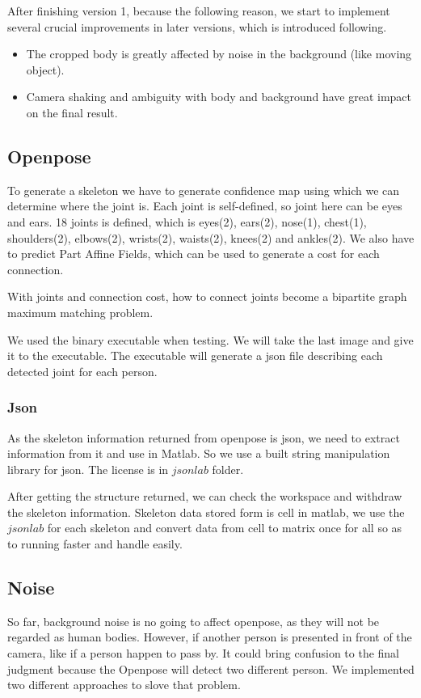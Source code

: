 \documentclass[11pt,twocolumn,letterpaper]{article}
\begin{document}
		\par
		After finishing version 1, because the following reason, we start to implement several crucial improvements in later versions, which is introduced following.
		\begin{itemize}
		\item The cropped body is greatly affected by noise in the background (like moving object).
		\item Camera shaking and ambiguity with body and background have great impact on the final result.
		\end{itemize}
	\subsection{Openpose\cite{cao2017realtime}}
	    \par To generate a skeleton we have to generate confidence map using which we can determine where the joint is.
		Each joint is self-defined, so joint here can be eyes and ears.
		18 joints is defined, which is eyes(2), ears(2), nose(1), chest(1), shoulders(2), elbows(2), wrists(2), waists(2), knees(2) and ankles(2).
		We also have to predict Part Affine Fields, which can be used to generate a cost for each connection.
		\par With joints and connection cost, how to connect joints become a bipartite graph maximum matching problem.
		\par We used the binary executable\cite{cao2017realtime} when testing. We will take the last image and give it to the executable. The executable will generate a json file describing each detected joint for each person.
	    \subsubsection{Json}
        \par As the skeleton information returned from openpose is json, we need to extract information from it and use in Matlab. So we use a built string manipulation library for json. The license is in $jsonlab$ folder.
        \par After getting the structure returned, we can check the workspace and withdraw the skeleton information. Skeleton data stored form is cell in matlab, we use the $jsonlab$ for each skeleton and convert data from cell to matrix once for all so as to running faster and handle easily.

	\subsection{Noise}
\par
So far, background noise is no going to affect openpose, as they will not be regarded as human bodies. However, if another person is presented in front of the camera, like if a person happen to pass by. It could bring confusion to the final judgment because the Openpose will detect two different person. We implemented two different approaches to slove that problem.
\end{document}
